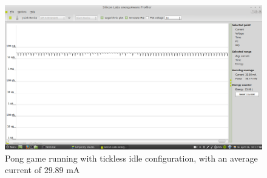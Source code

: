 \begin{figure}[H]
  \centering
  \includegraphics[clip, trim=0cm 0cm 0cm 0cm, width=12cm]{fig/runningIdle.png}
  \caption{Pong game running with tickless idle configuration, with an average current of 29.89 mA}
\end{figure}
